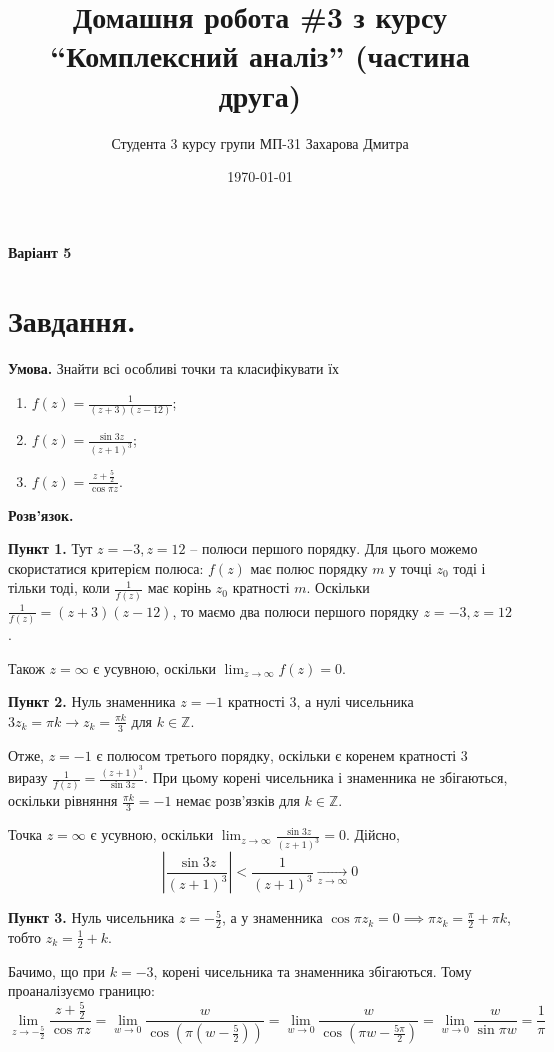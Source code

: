 \documentclass[14pt]{extarticle}
\title{Домашня робота \#3 з курсу ``Комплексний аналіз'' (частина друга)}
\author{Студента 3 курсу групи МП-31 Захарова Дмитра}
\date{\today}
\begin{document}
\maketitle

\begin{center}
\textbf{Варіант 5}
\end{center}

\section*{Завдання.} 

\textbf{Умова.} Знайти всі особливі точки та класифікувати їх
\begin{enumerate}
    \item $f(z) = \frac{1}{(z+3)(z-12)}$;
    \item $f(z) = \frac{\sin 3z}{(z+1)^3}$;
    \item $f(z) = \frac{z+\frac{5}{2}}{\cos \pi z}$.
\end{enumerate}

\textbf{Розв'язок.} 

\textbf{Пункт 1.} Тут $z=-3,z=12$ -- полюси першого порядку. Для цього можемо скористатися критерієм полюса: $f(z)$ має полюс порядку $m$ у точці $z_0$ тоді і тільки тоді, коли $\frac{1}{f(z)}$ має корінь $z_0$ кратності $m$. Оскільки $\frac{1}{f(z)} = (z+3)(z-12)$, то маємо два полюси першого порядку $z=-3,z=12$.

Також $z=\infty$ є усувною, оскільки $\lim_{z \to \infty}f(z) = 0$. 

\textbf{Пункт 2.} Нуль знаменника $z=-1$ кратності $3$, а нулі чисельника $3z_k=\pi k \to z_k = \frac{\pi k}{3}$ для $k \in \mathbb{Z}$. 

Отже, $z=-1$ є полюсом третього порядку, оскільки є коренем кратності $3$ виразу $\frac{1}{f(z)} = \frac{(z+1)^3}{\sin 3z}$. При цьому корені чисельника і знаменника не збігаються, оскільки рівняння $\frac{\pi k}{3} = -1$ немає розв'язків для $k \in \mathbb{Z}$. 

Точка $z=\infty$ є усувною, оскільки $\lim_{z \to \infty} \frac{\sin 3z}{(z+1)^3}=0$. Дійсно,
\[
\left|\frac{\sin 3z}{(z+1)^3}\right| < \frac{1}{(z+1)^3} \xrightarrow[\text{$z \to \infty$}]{} 0
\]

\textbf{Пункт 3.} Нуль чисельника $z=-\frac{5}{2}$, а у знаменника $\cos\pi z_k = 0 \implies \pi z_k = \frac{\pi}{2}+\pi k$, тобто $z_k = \frac{1}{2}+k$.

Бачимо, що при $k=-3$, корені чисельника та знаменника збігаються. Тому проаналізуємо границю:
\[
\lim_{z \to -\frac{5}{2}} \frac{z+\frac{5}{2}}{\cos \pi z} = \lim_{w \to 0} \frac{w}{\cos\left(\pi\left(w-\frac{5}{2}\right)\right)} = \lim_{w \to 0} \frac{w}{\cos \left(\pi w - \frac{5 \pi}{2}\right)} = \lim_{w \to 0} \frac{w}{\sin \pi w} = \frac{1}{\pi}
\]
\end{document}
